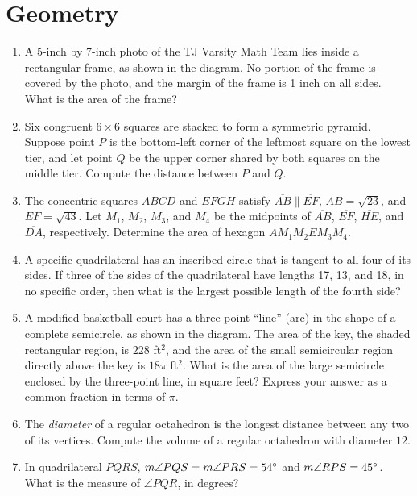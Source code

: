 \documentclass[11pt]{article}
\begin{document}
	\section{Geometry}
		\begin{enumerate}[1.]
			\item A 5-inch by 7-inch photo of the TJ Varsity Math Team lies inside a rectangular frame, as shown in the diagram. No portion of the frame is covered by the photo, and the margin of the frame is 1 inch on all sides. What is the area of the frame?
			
			\item Six congruent $6 \times 6$ squares are stacked to form a symmetric pyramid. Suppose point $P$ is the bottom-left corner of the leftmost square on the lowest tier, and let point $Q$ be the upper corner shared by both squares on the middle tier. Compute the distance between $P$ and $Q$.
			
			\item The concentric squares $ABCD$ and $EFGH$ satisfy $\overline{AB} \parallel \overline{EF}$, $AB = \sqrt{23}$, and $EF = \sqrt{43}$. Let $M_1$, $M_2$, $M_3$, and $M_4$ be the midpoints of $\overline{AB}$, $\overline{EF}$, $\overline{HE}$, and $\overline{DA}$, respectively. Determine the area of hexagon $AM_1M_2EM_3M_4$.
			
			\item A specific quadrilateral has an inscribed circle that is tangent to all four of its sides. If three of the sides of the quadrilateral have lengths 17, 13, and 18, in no specific order, then what is the largest possible length of the fourth side?
			
			\item A modified basketball court has a three-point ``line'' (arc) in the shape of a complete semicircle, as shown in the diagram. The area of the key, the shaded rectangular region, is $228$ ft$^2$, and the area of the small semicircular region directly above the key is $18\pi$ ft$^2$. What is the area of the large semicircle enclosed by the three-point line, in square feet? Express your answer as a common fraction in terms of $\pi$.
			
			\item The \textit{diameter} of a regular octahedron is the longest distance between any two of its vertices. Compute the volume of a regular octahedron with diameter $12$.
			
			\item In quadrilateral $PQRS$, $m\angle PQS = m\angle PRS = 54\degree$ and $m\angle RPS = 45\degree$. What is the measure of $\angle PQR$, in degrees?
			

\end{enumerate}
\end{document}
